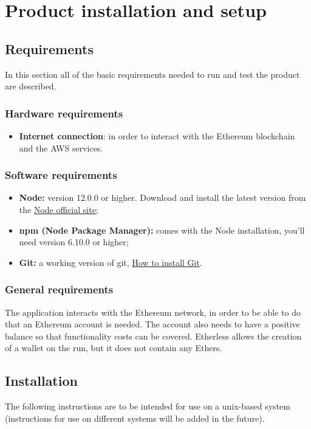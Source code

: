 \section{Product installation and setup}
  \subsection{Requirements}
    In this section all of the basic requirements needed to run and test the product are described.
    \subsubsection{Hardware requirements}
      \begin{itemize}
      	\item \textbf{Internet connection}: in order to interact with the Ethereum blockchain and the AWS services.
      \end{itemize}
    \subsubsection{Software requirements}
      \begin{itemize}
        \item \textbf{Node:} version 12.0.0 or higher. Download and install the latest version from the \href{https://nodejs.org/it/download/}{Node official site};
        \item \textbf{npm (Node Package Manager):} comes with the Node installation, you'll need version 6.10.0 or higher;
        \item \textbf{Git:} a working version of git, \href{https://git-scm.com/book/en/v2/Getting-Started-Installing-Git}{How to install Git}.
      \end{itemize}
    \subsubsection{General requirements}
      The application interacts with the Ethereum network, in order to be able to do that an Ethereum account is needed. The account also needs to have a positive balance so that functionality costs can be covered. Etherless allows the creation of a wallet on the run, but it does not contain any Ethers.
  \subsection{Installation}
    The following instructions are to be intended for use on a unix-based system (instructions for use on different systems will be added in the future).
